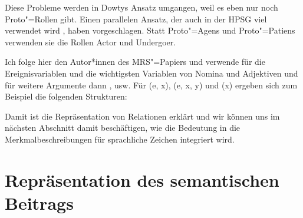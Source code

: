 Diese Probleme werden in Dowtys Ansatz umgangen, weil es eben nur noch Proto"=Rollen gibt. Einen
parallelen Ansatz, der auch in der HPSG viel verwendet wird \citep*{Davis2001a-u,KD2003a-u,DKW2024a}, haben \citet{VanVL97a-u}
vorgeschlagen. Statt Proto"=Agens und Proto"=Patiens verwenden sie die Rollen Actor und Undergoer.

Ich folge hier den Autor*innen des MRS"=Papiers und verwende für die Ereignisvariablen und die
wichtigsten Variablen von Nomina und Adjektiven \argzero und für weitere Argumente dann \argone,
\argtwo usw. Für (e, x), (e, x, y) und (x) ergeben sich zum Beispiel die folgenden Strukturen:
\eal
\ex
{}
\ex
{}
\zl

\ea
{}
\z
Damit ist die Repräsentation von Relationen erklärt und wir können uns im nächsten Abschnitt damit
beschäftigen, wie die Bedeutung in die Merkmalbeschreibungen für sprachliche Zeichen integriert wird.


\section{Repräsentation des semantischen Beitrags}
\label{sec-CONT}

